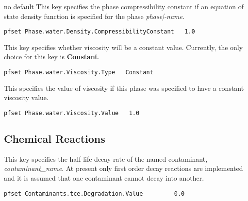 {no default}
{This key specifies the phase compressibility constant
if an equation of state density function is specified for the phase
{\em phase|-name}.}
\begin{display}\begin{verbatim}
pfset Phase.water.Density.CompressibilityConstant   1.0
\end{verbatim}\end{display}

{This key specifies whether viscosity will be a constant value.
Currently, the only choice for this key is {\bf Constant}.}
\begin{display}\begin{verbatim}
pfset Phase.water.Viscosity.Type   Constant
\end{verbatim}\end{display}

{This specifies the value of viscosity if this phase was specified to have a
constant viscosity value.}
\begin{display}\begin{verbatim}
pfset Phase.water.Viscosity.Value   1.0
\end{verbatim}\end{display}


\subsection{Chemical Reactions}
\label{Chemical Reactions}

{
This key specifies the half-life decay rate of the named contaminant,
{\em contaminant\_name}.  At present only first order decay reactions
are implemented and it is assumed that one contaminant cannot decay
into another.
}
\begin{display}\begin{verbatim}
pfset Contaminants.tce.Degradation.Value         0.0
\end{verbatim}\end{display}

